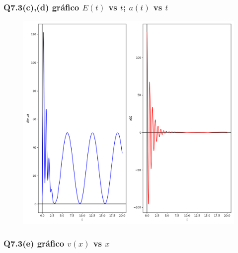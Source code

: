 \documentclass[12pt]{article}
\begin{document}
\subsubsection*{Q7.3(c),(d) gráfico $E(t)$ vs $t$; $a(t)$ vs $t$}

\begin{figure}[!hbt]
  \begin{center}
    \includegraphics[scale=0.7]{./Cod_73/E(t)_a(t)}
  \end{center}
\end{figure}

\clearpage

\subsubsection*{Q7.3(e) gráfico $v(x)$ vs $x$}
\end{document}
